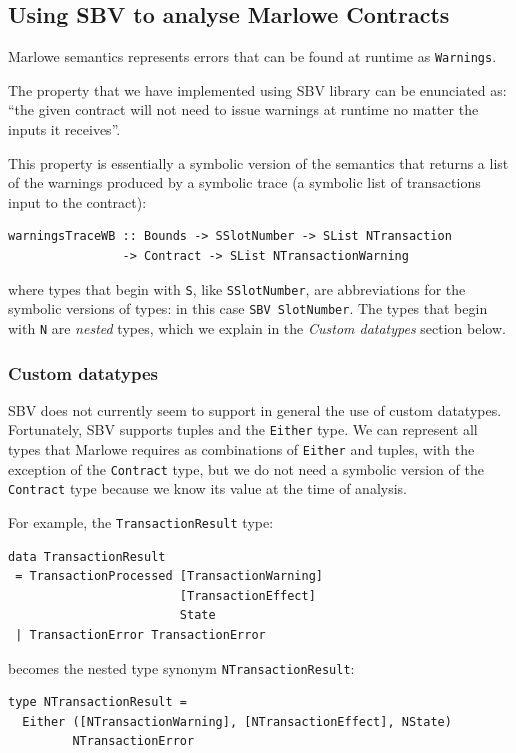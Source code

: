 \documentclass[runningheads]{llncs}
\begin{document}
\subsection{Using SBV to analyse Marlowe Contracts}

Marlowe semantics represents errors that can be found at runtime as \texttt{Warnings}.

The property that we have implemented using SBV library can be enunciated as: ``the given contract will not need to issue warnings at runtime no matter the inputs it receives''.

This property is essentially a symbolic version of the semantics that returns a list of the warnings produced by a symbolic trace (a symbolic list of transactions input to the contract):

\begin{verbatim}
warningsTraceWB :: Bounds -> SSlotNumber -> SList NTransaction
                -> Contract -> SList NTransactionWarning
\end{verbatim}

\noindent
where types that begin with \texttt{S}, like \texttt{SSlotNumber}, are abbreviations for the symbolic versions of types: in this case \texttt{SBV SlotNumber}.
The types that begin with \texttt{N} are \textit{nested} types, which we explain in the \textit{Custom datatypes} section below.

\subsubsection{Custom datatypes}

SBV does not currently seem to support in general the use of custom datatypes. Fortunately, SBV supports tuples and the \texttt{Either} type. We can represent all types that Marlowe requires as combinations of \texttt{Either} and tuples, with the exception of the \texttt{Contract} type, but we do not need a symbolic version of the \texttt{Contract} type because we know its value at the time of analysis.

\noindent
For example, the \texttt{TransactionResult} type:
\begin{verbatim}
data TransactionResult
 = TransactionProcessed [TransactionWarning]
                        [TransactionEffect]
                        State
 | TransactionError TransactionError
\end{verbatim}
\noindent
becomes the nested type synonym \texttt{NTransactionResult}:

\begin{verbatim}
type NTransactionResult =
  Either ([NTransactionWarning], [NTransactionEffect], NState)
         NTransactionError
\end{verbatim}
\end{document}
